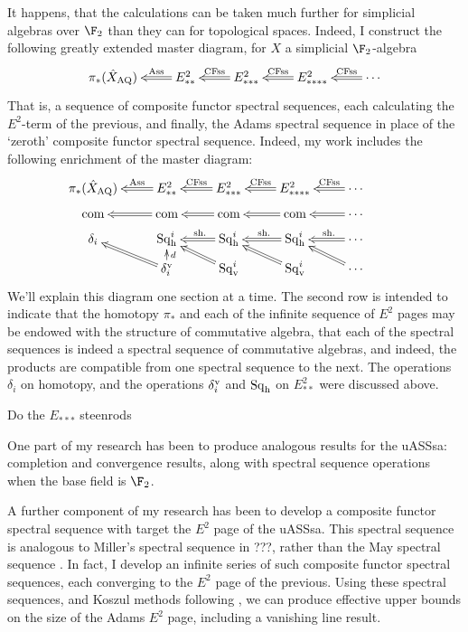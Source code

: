 \documentclass[11pt]{article}
\newcommand{\Sq}{\mathrm{Sq}}
\begin{document}
It happens, that the calculations can be taken much further for simplicial algebras over $\F_2$ than they can for topological spaces. Indeed, I construct the following greatly extended master diagram, for $X$ a simplicial $\F_2$-algebra
\[\xymatrix@R=4mm{
\pi_{*}(\hat X_\textup{AQ})&%
\ar@{=>}[l]_-{\textup{Ass}}
E^2_{**}&%
\ar@{=>}[l]_-{\textup{CFss}}
E^2_{***}
&%
E^2_{****}
\ar@{=>}[l]_-{\textup{CFss}}&%
\cdots
\ar@{=>}[l]_-{\textup{CFss}}%
}\]
That is, a sequence of composite functor spectral sequences, each calculating the $E^2$-term of the previous, and finally, the Adams spectral sequence in place of the `zeroth' composite functor spectral sequence. Indeed, my work includes the following enrichment of the master diagram:
\[\xymatrix@R=2mm{
\pi_{*}(\hat X_\textup{AQ})&%
\ar@{=>}[l]_-{\textup{Ass}}
E^2_{**}&%
\ar@{=>}[l]_-{\textup{CFss}}
E^2_{***}
&%
E^2_{****}
\ar@{=>}[l]_-{\textup{CFss}}&%
\cdots
\ar@{=>}[l]_-{\textup{CFss}}%
\\
\textup{com}&
\textup{com}\ar@{=>}[l]&
\textup{com}\ar@{=>}[l]&
\textup{com}\ar@{=>}[l]&
\cdots \ar@{=>}[l]\\
\delta_i&
\Sq^i_\textup{h}&
\Sq^i_\textup{h}\ar@{=>}[l]_-{\ \textup{sh.}}&
\Sq^i_\textup{h}\ar@{=>}[l]_-{\ \textup{sh.}}&
\cdots \ar@{=>}[l]_-{\ \textup{sh.}}\\
&
\delta^\textup{v}_i\ar@{=>}[ul]\ar[u]_-d
&
\Sq_\textup{v}^i\ar@{=>}[ul]&
\Sq_\textup{v}^i\ar@{=>}[ul]&
\cdots \ar@{=>}[ul]&
}\]
We'll explain this diagram one section at a time. The second row is intended to indicate that the homotopy $\pi_*$ and each of the infinite sequence of $E^2$ pages may be endowed with the structure of commutative algebra, that each of the spectral sequences is indeed a spectral sequence of commutative algebras, and indeed, the products are compatible from one spectral sequence to the next. The operations $\delta_i$ on homotopy, and the operations $\delta_i^\textup{v}$ and $\Sq_\textup{h}$ on $E^2_{**}$ were discussed above.

Do the $E_{***}$ steenrods

\pagebreak

One part of my research has been to produce analogous results for the uASSsa: completion and convergence results, along with spectral sequence operations when the base field is $\F_2$.

A further component of my research has been to develop a composite functor spectral sequence with target the $E^2$ page of the uASSsa. This spectral sequence is analogous to Miller's spectral sequence in ???, rather than the May spectral sequence \cite{MayRestLie.pdf}. In fact, I develop an infinite series of such composite functor spectral sequences, each converging to the $E^2$ page of the previous. Using these spectral sequences, and Koszul methods following \cite{PriddyKoszul.pdf}, we can produce effective upper bounds on the size of the Adams $E^2$ page, including a vanishing line result.
\end{document}
